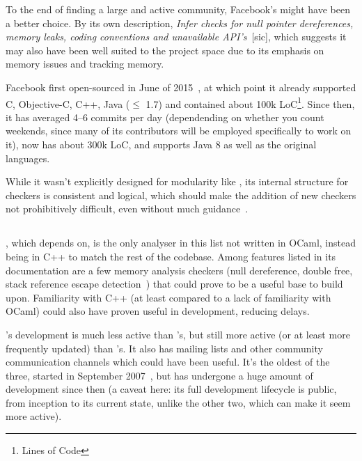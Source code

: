 To the end of finding a large and active community, Facebook's  might have been a better choice. By its own description, \textit{Infer checks for null pointer dereferences, memory leaks, coding conventions and unavailable API’s}~[sic], which suggests it may also have been well suited to the project space due to its emphasis on memory issues and tracking memory.

Facebook first open-sourced  in June of 2015~\cite{infergit}, at which point it already supported C, Objective-C, C++, Java ($\le$ 1.7) and contained about 100k LoC\footnote{Lines of Code}. Since then, it has averaged 4–6 commits per day (dependending on whether you count weekends, since many of its contributors will be employed specifically to work on it), now has about 300k LoC, and supports Java 8 as well as the original languages.

While it wasn't explicitly designed for modularity like , its internal structure for checkers is consistent and logical, which should make the addition of new checkers not prohibitively difficult, even without much guidance~\cite{infercheckers}.

\subsection{}

, which  depends on, is the only analyser in this list not written in OCaml, instead being in C++ to match the rest of the  codebase. Among features listed in its documentation are a few memory analysis checkers (null dereference, double free, stack reference escape detection~\cite{clangchecks}) that could prove to be a useful base to build upon. Familiarity with C++ (at least compared to a lack of familiarity with OCaml) could also have proven useful in development, reducing delays.

's development is much less active than 's, but still more active (or at least more frequently updated) than 's. It also has mailing lists and other community communication channels which could have been useful. It's the oldest of the three, started in September 2007~\cite{clangrelease}, but has undergone a huge amount of development since then (a caveat here: its full development lifecycle is public, from inception to its current state, unlike the other two, which can make it seem more active).

